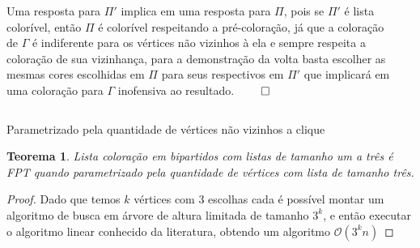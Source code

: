 \documentclass[9pt, compress]{beamer}
\newtheorem{teorema}{Teorema}
\newcommand{\?}{\textcolor{warn}{\textit{?}}}
\begin{document}
     \begin{frame}
       \begin{columns}
        \begin{column}{0.5\textwidth}
          Uma resposta para $\Pi'$ implica em uma resposta para $\Pi$, pois se $\Pi'$ é lista colorível, então $\Pi$ é colorível respeitando a pré-coloração, já que a coloração de $\Gamma$ é indiferente para os vértices não vizinhos à ela e sempre respeita a coloração de sua vizinhança, para a demonstração da volta basta escolher as mesmas cores escolhidas em $\Pi$ para seus respectivos em $\Pi'$ que implicará em uma coloração para $\Gamma$ inofensiva ao resultado. $\qed$
        \end{column}
        \begin{column}{0.5\textwidth}
        \end{column}
      \end{columns}
     \end{frame}
     \begin{frame}{Parametrizado pela quantidade de vértices não vizinhos a clique}
       
        \begin{teorema}
         Lista coloração em bipartidos com listas de tamanho um a três é FPT quando parametrizado pela quantidade de vértices com lista de tamanho três.
        \end{teorema}
        \begin{proof}
         Dado que temos $k$ vértices com 3 escolhas cada é possível montar um algoritmo de busca em árvore de altura limitada de tamanho $3^k$, e então executar o algoritmo linear conhecido da literatura, obtendo um algoritmo $\mathcal{O}(3^kn)$
 
\end{proof}
     \end{frame}
\end{document}
